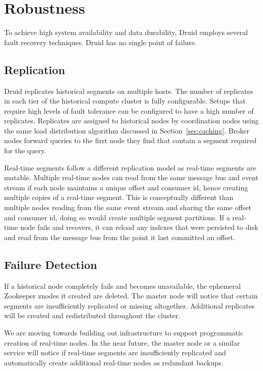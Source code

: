 \documentclass{vldb}
\begin{document}
\section{Robustness}
\label{sec:robustness}
To achieve high system availability and data durability, Druid employs
several fault recovery techniques. Druid has no single point of
failure.

\subsection{Replication}
Druid replicates historical segments on multiple hosts. The number of
replicates in each tier of the historical compute cluster is fully
configurable. Setups that require high levels of fault tolerance can
be configured to have a high number of replicates. Replicates are
assigned to historical nodes by coordination nodes using the same load
distribution algorithm discussed in Section~\ref{sec:caching}. Broker nodes forward queries to the first node they find that contain a segment required for the query.

Real-time segments follow a different replication model as real-time
segments are mutable. Multiple real-time nodes can read from the same message
bus and event stream if each node maintains a unique offset and consumer id, hence creating multiple copies
of a real-time segment. This is conceptually different than multiple
nodes reading from the same event stream and sharing the same offset and consumer id, doing so would create
multiple segment partitions. If a real-time node fails and recovers, it can
reload any indexes that were persisted to disk and read from the
message bus from the point it last committed an offset.

\subsection{Failure Detection}
If a historical node completely fails and becomes unavailable, the
ephemeral Zookeeper znodes it created are deleted. The master node
will notice that certain segments are insufficiently replicated or
missing altogether. Additional replicates will be created and
redistributed throughout the cluster.

We are moving towards building out infrastructure to support
programmatic creation of real-time nodes. In the near future, the
master node or a similar service will notice if real-time segments are insufficiently
replicated and automatically create additional real-time nodes as
redundant backups.
\end{document}

